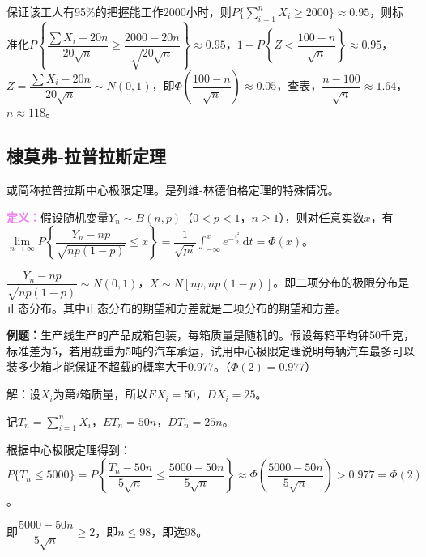 \documentclass[UTF8, 12pt]{ctexart}
\begin{document}
保证该工人有95\%的把握能工作2000小时，则$P\{\sum\limits_{i=1}^nX_i\geqslant2000\}\approx0.95$，则标准化$P\left\{\dfrac{\sum X_i-20n}{20\sqrt{n}}\geqslant\dfrac{2000-20n}{\sqrt{20\sqrt{n}}}\right\}\approx0.95$，$1-P\left\{Z<\dfrac{100-n}{\sqrt{n}}\right\}\approx0.95$，$Z=\dfrac{\sum X_i-20n}{20\sqrt{n}}\sim N(0,1)$，即$\varPhi(\dfrac{100-n}{\sqrt{n}})\approx0.05$，查表，$\dfrac{n-100}{\sqrt{n}}\approx1.64$，$n\approx118$。

\subsection{棣莫弗-拉普拉斯定理}

或简称拉普拉斯中心极限定理。是列维-林德伯格定理的特殊情况。

\textcolor{violet}{\textbf{定义：}}假设随机变量$Y_n\sim B(n,p)$（$0<p<1$，$n\geqslant1$），则对任意实数$x$，有$\lim\limits_{n\to\infty}P\left\{\dfrac{Y_n-np}{\sqrt{np(1-p)}}\leqslant x\right\}=\dfrac{1}{\sqrt{pi}}\int_{-\infty}^xe^{-\frac{t^2}{2}}\,\textrm{d}t=\varPhi(x)$。\medskip

$\dfrac{Y_n-np}{\sqrt{np(1-p)}}\sim N(0,1)$，$X\sim N[np,np(1-p)]$。即二项分布的极限分布是正态分布。其中正态分布的期望和方差就是二项分布的期望和方差。

\textbf{例题：}生产线生产的产品成箱包装，每箱质量是随机的。假设每箱平均钟50千克，标准差为5，若用载重为5吨的汽车承运，试用中心极限定理说明每辆汽车最多可以装多少箱才能保证不超载的概率大于0.977。（$\varPhi(2)=0.977$）

解：设$X_i$为第$i$箱质量，所以$EX_i=50$，$DX_i=25$。

记$T_n=\sum\limits_{i=1}^nX_i$，$ET_n=50n$，$DT_n=25n$。

根据中心极限定理得到：$P\{T_n\leqslant5000\}=P\left\{\dfrac{T_n-50n}{5\sqrt{n}}\leqslant\dfrac{5000-50n}{5\sqrt{n}}\right\}\approx\varPhi\left(\dfrac{5000-50n}{5\sqrt{n}}\right)>0.977=\varPhi(2)$。

即$\dfrac{5000-50n}{5\sqrt{n}}\geqslant2$，即$n\leqslant98$，即选98。
\end{document}
